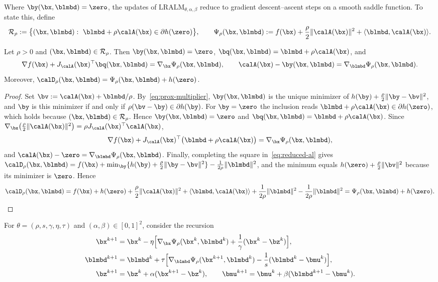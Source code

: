Where \(\by(\bx,\blmbd)=\zero\), the updates of
\(\mathrm{LRALM}_{\theta,\alpha,\beta}\) reduce to gradient
descent--ascent steps on a smooth saddle function. To state this, define
\[
\mathcal R_\rho:=\bigl\{(\bx,\blmbd):\ \blmbd+\rho\calA(\bx)\in\partial h(\zero)\bigr\},
\qquad
\Psi_\rho(\bx,\blmbd):=f(\bx)+\frac{\rho}{2}\|\calA(\bx)\|^2+\langle\blmbd,\calA(\bx)\rangle .
\]

\begin{proposition}
\label{prop:reduction}
Let \(\rho>0\) and \((\bx,\blmbd)\in\mathcal R_\rho\). Then
\(\by(\bx,\blmbd)=\zero\), \(\bq(\bx,\blmbd)=\blmbd+\rho\calA(\bx)\), and
\[
\nabla f(\bx)+J_{\calA}(\bx)^\top\bq(\bx,\blmbd)=\nabla_{\bx}\Psi_\rho(\bx,\blmbd),
\qquad
\calA(\bx)-\by(\bx,\blmbd)=\nabla_{\blmbd}\Psi_\rho(\bx,\blmbd).
\]
Moreover,
\(\calD_\rho(\bx,\blmbd)=\Psi_\rho(\bx,\blmbd)+h(\zero)\).
\end{proposition}

\begin{proof}
Set \(\bv:=\calA(\bx)+\blmbd/\rho\). By~\eqref{eq:prox-multiplier}, \(\by(\bx,\blmbd)\)
is the unique minimizer of \(h(\by)+\frac{\rho}{2}\|\by-\bv\|^2\), and
\(\by\) is this minimizer if and only if \(\rho(\bv-\by)\in\partial h(\by)\).
For \(\by=\zero\) the inclusion reads
\(\blmbd+\rho\calA(\bx)\in\partial h(\zero)\), which holds because
\((\bx,\blmbd)\in\mathcal R_\rho\). Hence \(\by(\bx,\blmbd)=\zero\) and
\(\bq(\bx,\blmbd)=\blmbd+\rho\calA(\bx)\). Since
\(\nabla_{\bx}\bigl(\frac{\rho}{2}\|\calA(\bx)\|^2\bigr)=\rho J_{\calA}(\bx)^\top\calA(\bx)\),
\[
\nabla f(\bx)+J_{\calA}(\bx)^\top\bigl(\blmbd+\rho\calA(\bx)\bigr)
=\nabla_{\bx}\Psi_\rho(\bx,\blmbd),
\]
and \(\calA(\bx)-\zero=\nabla_{\blmbd}\Psi_\rho(\bx,\blmbd)\).
Finally, completing the square in~\eqref{eq:reduced-al} gives
\(\calD_\rho(\bx,\blmbd)=f(\bx)+\min_{\by}\{h(\by)+\frac{\rho}{2}\|\by-\bv\|^2\}
-\frac{1}{2\rho}\|\blmbd\|^2\), and the minimum equals
\(h(\zero)+\frac{\rho}{2}\|\bv\|^2\) because its minimizer is \(\zero\). Hence
\[
\calD_\rho(\bx,\blmbd)
=f(\bx)+h(\zero)+\frac{\rho}{2}\|\calA(\bx)\|^2+\langle\blmbd,\calA(\bx)\rangle
+\frac{1}{2\rho}\|\blmbd\|^2-\frac{1}{2\rho}\|\blmbd\|^2
=\Psi_\rho(\bx,\blmbd)+h(\zero).
\]
\end{proof}

For \(\theta=(\rho,s,\gamma,\eta,\tau)\) and \((\alpha,\beta)\in[0,1]^2\), consider
the recursion
\begin{equation}\label{eq:gda-recursion}
\begin{aligned}
\bx^{k+1}&=\bx^k-\eta\Bigl[\nabla_{\bx}\Psi_\rho(\bx^k,\blmbd^k)
  +\frac{1}{\gamma}(\bx^k-\bz^k)\Bigr],\\
\blmbd^{k+1}&=\blmbd^k+\tau\Bigl[\nabla_{\blmbd}\Psi_\rho(\bx^{k+1},\blmbd^k)
  -\frac{1}{s}(\blmbd^k-\bmu^k)\Bigr],\\
\bz^{k+1}&=\bz^k+\alpha(\bx^{k+1}-\bz^k),\qquad
\bmu^{k+1}=\bmu^k+\beta(\blmbd^{k+1}-\bmu^k).
\end{aligned}
\end{equation}

